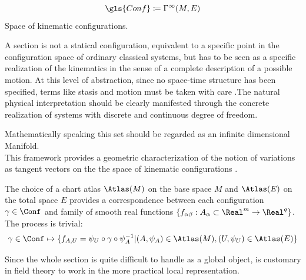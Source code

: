 \documentclass[Main]{subfiles}
\begin{document}
	\begin{notationfix}
		\begin{displaymath}
			\gls{Conf} \coloneqq \Gamma^\infty(M,E)
		\end{displaymath}
		Space of kinematic configurations.
	\end{notationfix}

	A section is not a statical configuration, equivalent to a specific point in the configuration space of ordinary classical systems, but has to be seen as a specific realization of the kinematics in the sense of  a complete description of a possible motion.
	At this level of abstraction, since no space-time structure has been specified, terms like stasis and motion must be taken with care .The natural physical interpretation should be clearly manifested through the concrete realization of systems with discrete and continuous degree of freedom.
	
	\begin{observation}
	Mathematically speaking this set should be regarded as an infinite dimensional Manifold. 
	\\
	This framework provides a geometric characterization of the notion of variations as tangent vectors on the the space of kinematic configurations .\cite{Forger2005}
	\end{observation}
	
	\begin{observation}
	The choice of a chart atlas $\Atlas(M)$ on the base space $M$ and $\Atlas(E)$ on the total space $E$ provides a correspondence between each configuration $\gamma \in \Conf$ and family of smooth real functions $\{f_{\alpha \beta}:A_\alpha \subset \Real^m \rightarrow \Real^q \}$.
	The process is trivial:
	\begin{displaymath}
		\gamma \in \Conf \mapsto \{f_{A,U}=\psi_U \circ \gamma \circ \psi_A^{-1} \vert (A,\psi_A) \in \Atlas(M), (U,\psi_U)\in \Atlas(E)   \}
	\end{displaymath}
	

	Since the whole section is quite difficult to handle  as a global object, is customary in field theory to work in the more practical local representation. 
	\end{observation}	
	
\end{document}
